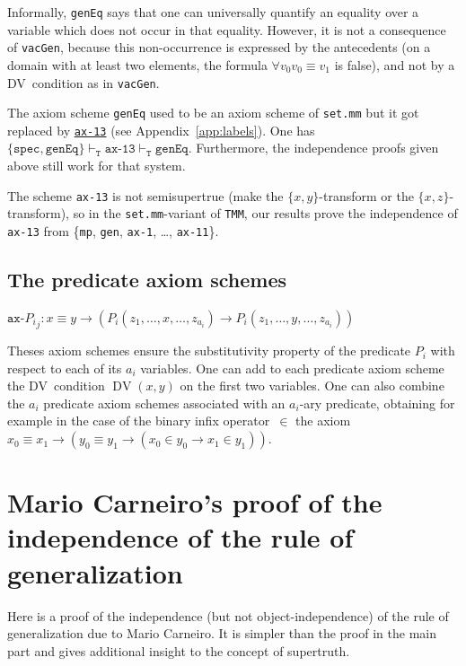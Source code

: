 \documentclass[11pt]{article}
\DeclareMathOperator{\DV}{DV}
\theoremstyle{plain}
\theoremstyle{definition}
\theoremstyle{remark}
\begin{document}
Informally, \texttt{genEq} says that one can universally quantify an equality over a variable which
does not occur in that equality.
However, it is not a consequence of \texttt{vacGen}, because this non-occurrence is expressed by
the antecedents (on a domain with at least two elements, the formula $\forall v_0 v_0 \equiv v_1$
is false), and not by a DV~condition as in \texttt{vacGen}.

The axiom scheme \texttt{genEq} used to be an axiom scheme of \texttt{set.mm} but it got replaced by
\href{https://us.metamath.org/mpeuni/ax12v2.html}{\texttt{ax-13}} (see Appendix~\ref{app:labels}).
One has
$\{\texttt{spec}, \texttt{genEq}\} \vdash_\texttt{T} \texttt{ax-13} \vdash_\texttt{T} \texttt{genEq}$.
Furthermore, the independence proofs given above still work for that system.

The scheme \texttt{ax-13} is not semisupertrue (make the $\{x, y\}$-transform or the
$\{x, z\}$-transform), so in the \texttt{set.mm}-variant of \texttt{TMM}, our results prove the
independence of \texttt{ax-13} from \{\texttt{mp}, \texttt{gen}, \texttt{ax-1}, \dots, \texttt{ax-11}\}.


\subsection{The predicate axiom schemes}

$\texttt{ax-${P_i}_j$}:
x \equiv y \to (P_i(z_1, \ldots, x, \ldots, z_{a_i}) \to P_i(z_1, \ldots, y, \ldots, z_{a_i}))$
\vspace{0.5em}

Theses axiom schemes ensure the substitutivity property of the predicate $P_i$ with respect to each of
its $a_i$ variables.
One can add to each predicate axiom scheme the DV~condition $\DV(x, y)$ on the first two variables.
One can also combine the $a_i$ predicate axiom schemes associated with an $a_i$-ary predicate,
obtaining for example in the case of the binary infix operator~$\in$ the axiom
$x_0 \equiv x_1 \to (y_0 \equiv y_1 \to (x_0 \in y_0 \to x_1 \in y_1))$.





\section{Mario Carneiro's proof of the independence of the rule of generalization}
\label{app:gen}

Here is a proof of the independence (but not object-independence) of the rule of generalization due
to Mario Carneiro.
It is simpler than the proof in the main part and gives additional insight to the concept of supertruth.
\end{document}
